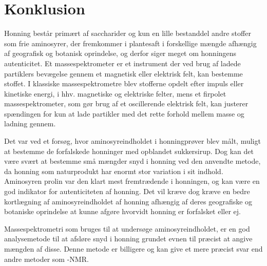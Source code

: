 \chapter*{Konklusion}
Honning består primært af saccharider og kun en lille bestanddel andre stoffer som frie aminosyrer,
der fremkommer i plantesaft i forskellige mængde afhængig af geografisk og botanisk oprindelse, og derfor siger meget om honningens autenticitet.
Et massespektrometer er et instrument der ved brug af ladede partiklers bevægelse gennem et magnetisk eller elektrisk felt, kan bestemme stoffet.
I klassiske massespektrometre blev stofferne opdelt efter impuls eller kinetiske energi, i hhv. magnetiske og elektriske felter, mens et firpolet massespektrometer, som gør brug af et oscillerende elektrisk felt, kan justerer spændingen for kun at lade partikler med det rette forhold mellem masse og ladning gennem.
\par Det var ved et forsøg, hvor aminosyreindholdet i honningprøver blev målt, muligt at bestemme de forfalskede honninger med opblandet sukkersirup.
Dog kan det være svært at bestemme små mængder snyd i honning ved den anvendte metode, da honning som naturprodukt har enormt stor variation i sit indhold.
Aminosyren prolin var den klart mest fremtrædende i honningen, og kan være en god indikator for autenticiteten af honning.
Det vil kræve dog kræve en bedre kortlægning af aminosyreindholdet af honning afhængig af deres geografiske og botaniske oprindelse at kunne afgøre hvorvidt honning er forfalsket eller ej.
\par Massespektrometri som bruges til at undersøge aminosyreindholdet, er en god analysemetode til at afsløre snyd i honning grundet evnen til præcist at angive mængden af disse.
Denne metode er billigere og kan give et mere præcist svar end andre metoder som -NMR.
